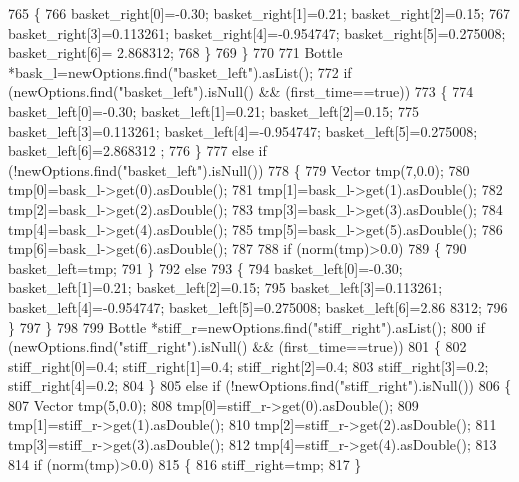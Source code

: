 \begin{DoxyCode}
765         \{
766             basket\_right[0]=-0.30; basket\_right[1]=0.21; basket\_right[2]=0.15;
767             basket\_right[3]=0.113261; basket\_right[4]=-0.954747; basket\_right[5]=0.275008; basket\_right[6]=
      2.868312;
768         \}
769     \}
770 
771     Bottle *bask\_l=newOptions.find(\textcolor{stringliteral}{"basket\_left"}).asList();
772     \textcolor{keywordflow}{if} (newOptions.find(\textcolor{stringliteral}{"basket\_left"}).isNull() && (first\_time==\textcolor{keyword}{true}))
773     \{
774         basket\_left[0]=-0.30; basket\_left[1]=0.21; basket\_left[2]=0.15;
775         basket\_left[3]=0.113261; basket\_left[4]=-0.954747; basket\_left[5]=0.275008; basket\_left[6]=2.868312
      ;
776     \}
777     \textcolor{keywordflow}{else} \textcolor{keywordflow}{if} (!newOptions.find(\textcolor{stringliteral}{"basket\_left"}).isNull())
778     \{
779         Vector tmp(7,0.0);
780         tmp[0]=bask\_l->get(0).asDouble();
781         tmp[1]=bask\_l->get(1).asDouble();
782         tmp[2]=bask\_l->get(2).asDouble();
783         tmp[3]=bask\_l->get(3).asDouble();
784         tmp[4]=bask\_l->get(4).asDouble();
785         tmp[5]=bask\_l->get(5).asDouble();
786         tmp[6]=bask\_l->get(6).asDouble();
787 
788         \textcolor{keywordflow}{if} (norm(tmp)>0.0)
789         \{
790             basket\_left=tmp;
791         \}
792         \textcolor{keywordflow}{else}
793         \{
794             basket\_left[0]=-0.30; basket\_left[1]=0.21; basket\_left[2]=0.15;
795             basket\_left[3]=0.113261; basket\_left[4]=-0.954747; basket\_left[5]=0.275008; basket\_left[6]=2.86
      8312;
796         \}
797     \}
798 
799     Bottle *stiff\_r=newOptions.find(\textcolor{stringliteral}{"stiff\_right"}).asList();
800     \textcolor{keywordflow}{if} (newOptions.find(\textcolor{stringliteral}{"stiff\_right"}).isNull() && (first\_time==\textcolor{keyword}{true}))
801     \{
802         stiff\_right[0]=0.4; stiff\_right[1]=0.4; stiff\_right[2]=0.4;
803         stiff\_right[3]=0.2; stiff\_right[4]=0.2;
804     \}
805     \textcolor{keywordflow}{else} \textcolor{keywordflow}{if} (!newOptions.find(\textcolor{stringliteral}{"stiff\_right"}).isNull())
806     \{
807         Vector tmp(5,0.0);
808         tmp[0]=stiff\_r->get(0).asDouble();
809         tmp[1]=stiff\_r->get(1).asDouble();
810         tmp[2]=stiff\_r->get(2).asDouble();
811         tmp[3]=stiff\_r->get(3).asDouble();
812         tmp[4]=stiff\_r->get(4).asDouble();
813 
814         \textcolor{keywordflow}{if} (norm(tmp)>0.0)
815         \{
816             stiff\_right=tmp;
817         \}

\end{DoxyCode}
